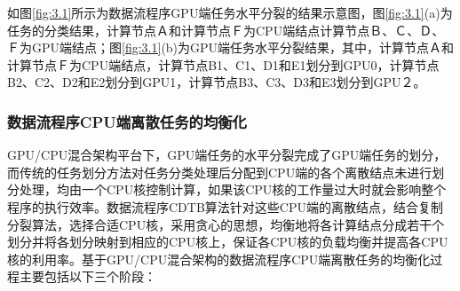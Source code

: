 如图\ref{fig:3.1}所示为数据流程序GPU端任务水平分裂的结果示意图，图\ref{fig:3.1}(a)为任务的分类结果，计算节点Ａ和计算节点Ｆ为CPU端结点计算节点Ｂ、Ｃ、Ｄ、Ｆ为GPU端结点；图\ref{fig:3.1}(b)为GPU端任务水平分裂结果，其中，计算节点Ａ和计算节点Ｆ为CPU端结点，计算节点B1、C1、D1和E1划分到GPU0，计算节点B2、C2、D2和E2划分到GPU1，计算节点B3、C3、D3和E3划分到GPU２。

\subsubsection{数据流程序CPU端离散任务的均衡化}
GPU/CPU混合架构平台下，GPU端任务的水平分裂完成了GPU端任务的划分，而传统的任务划分方法对任务分类处理后分配到CPU端的各个离散结点未进行划分处理，均由一个CPU核控制计算，如果该CPU核的工作量过大时就会影响整个程序的执行效率。数据流程序CDTB算法针对这些CPU端的离散结点，结合复制分裂算法，选择合适CPU核，采用贪心的思想，均衡地将各计算结点分成若干个划分并将各划分映射到相应的CPU核上，保证各CPU核的负载均衡并提高各CPU核的利用率。基于GPU/CPU混合架构的数据流程序CPU端离散任务的均衡化过程主要包括以下三个阶段：

